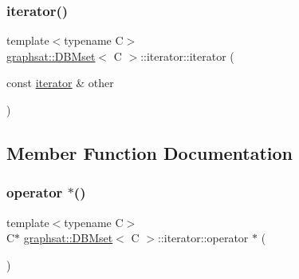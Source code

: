 \mbox{\label{classgraphsat_1_1_d_b_mset_1_1iterator_a9ef8208ccdda6529944521ce796adeac}} 
\subsubsection{\texorpdfstring{iterator()}{iterator()}\hspace{0.1cm}{\footnotesize\ttfamily [3/3]}}
{\footnotesize\ttfamily template$<$typename C$>$ \\
\mbox{\hyperlink{classgraphsat_1_1_d_b_mset}{graphsat\+::\+D\+B\+Mset}}$<$ C $>$\+::iterator\+::iterator (\begin{DoxyParamCaption}\item[{const \mbox{\hyperlink{classgraphsat_1_1_d_b_mset_1_1iterator}{iterator}} \&}]{other }\end{DoxyParamCaption})\hspace{0.3cm}{\ttfamily [inline]}}



\subsection{Member Function Documentation}
\mbox{\label{classgraphsat_1_1_d_b_mset_1_1iterator_ad825adc5a116f2637e87325db768d113}} 
\subsubsection{\texorpdfstring{operator $\ast$()}{operator *()}}
{\footnotesize\ttfamily template$<$typename C$>$ \\
C$\ast$ \mbox{\hyperlink{classgraphsat_1_1_d_b_mset}{graphsat\+::\+D\+B\+Mset}}$<$ C $>$\+::iterator\+::operator $\ast$ (\begin{DoxyParamCaption}{ }\end{DoxyParamCaption})\hspace{0.3cm}{\ttfamily [inline]}}


